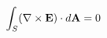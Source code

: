 \documentclass[preview]{standalone}
\begin{document}
\begin{align*}
\special{dvisvgm:raw <g id='unique000'>}\int_S(\nabla\times\mathbf E)\cdot d\mathbf A=0\special{dvisvgm:raw </g>}
\end{align*}
\end{document}
